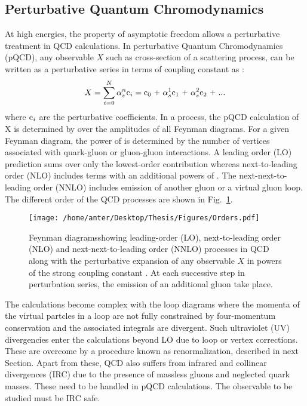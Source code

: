\subsection{Perturbative Quantum Chromodynamics}
At high energies, the property of asymptotic freedom allows a perturbative treatment in QCD calculations. In perturbative Quantum Chromodynamics (pQCD), any observable $X$ such as cross-section of a scattering process, can be written as a perturbative series in terms of coupling constant \alps as : 
\begin{equation}
X = \sum\limits_{i=0}^{N} \alpha^n_s {\rm c}_i = {\rm c}_0~\plus \alpha^1_s {\rm c}_1~\plus \alpha^2_s {\rm c}_2~\plus ...
\end{equation} 
where ${\rm c}_i$ are the perturbative coefficients. In a process, the pQCD calculation of X is determined by over the amplitudes of all Feynman diagrams. For a given Feynman diagram, the power of \alps is determined by the number of vertices associated with quark-gluon or gluon-gluon interactions. A leading order (LO) prediction sums over only the lowest-order contribution whereas next-to-leading order (NLO) includes terms with an additional powers of \alps. The next-next-to-leading order (NNLO) includes emission of another gluon or a virtual gluon loop. The different order of the QCD processes are shown in Fig.~\ref{fig:orders}.
\begin{figure}[!h]
\begin{center}
\hspace*{-1mm}
\texttt{[image: /home/anter/Desktop/Thesis/Figures/Orders.pdf]}\\
\vspace*{4mm}
\caption[Feyn]{Feynman diagrams\footnotemark showing leading-order (LO), next-to-leading order (NLO) and next-next-to-leading order (NNLO) processes in QCD along with the perturbative expansion of any observable $X$ in powers of the strong coupling constant \alps. At each successive step in perturbation series, the emission of an additional gluon take place.}
\label{fig:orders}
\end{center}
\end{figure}
The calculations become complex with the loop diagrams where the momenta of the virtual partcles in a loop are not fully constrained by four-momentum conservation and the associated integrals are divergent. Such ultraviolet (UV) divergencies enter the calculations beyond LO due to loop or vertex corrections. These are overcome by a procedure known as renormalization, described in next Section. Apart from these, QCD also suffers from infrared and collinear divergences (IRC) due to the presence of massless gluons and neglected quark masses. These need to be handled in pQCD calculations. The observable to be studied must be IRC safe. 

